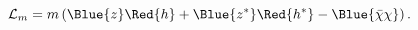 \begin{equation}
  {\cal L}_m=m\left( \Blue{z}\Red{h}+\Blue{z^*}\Red{h^*}-\Blue{\bar \chi \chi
  }\right).
 \label{Lchiralm}
\end{equation}

